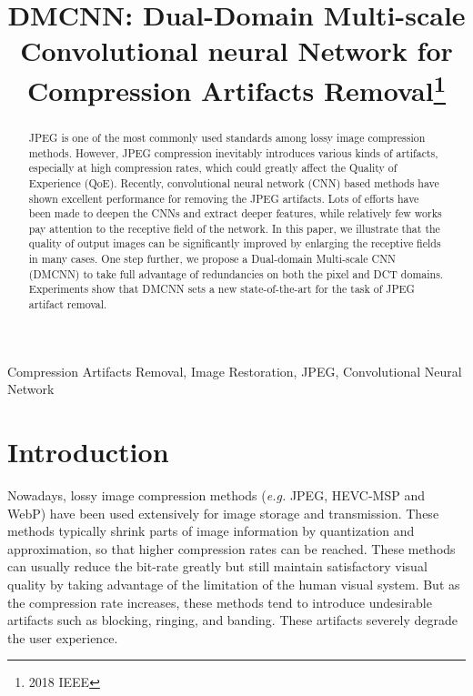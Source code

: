 \documentclass{article}
\title{DMCNN: Dual-Domain Multi-scale Convolutional neural Network 
for Compression Artifacts Removal\thanks{ 2018 IEEE}}
\begin{document}
\maketitle
\vspace{-0.2cm}
\begin{abstract}
JPEG is one of the most commonly used standards among lossy image compression
methods. However, JPEG compression inevitably introduces various kinds of
artifacts, especially at high compression rates, which could greatly affect
the Quality of Experience (QoE). Recently, convolutional neural network (CNN)
based methods have shown excellent performance for removing the JPEG artifacts.
Lots of efforts have been made to deepen the CNNs and extract deeper features,
while relatively few works pay attention to the receptive field of the network.
In this paper, we illustrate that the quality of output images can be
significantly improved by enlarging the receptive fields in many cases.
One step further, we propose a Dual-domain Multi-scale CNN (DMCNN) to
take full advantage of redundancies on both the pixel and DCT domains.
Experiments show that DMCNN sets a new state-of-the-art for the task of
JPEG artifact removal.
\end{abstract}
\begin{keywords}
Compression Artifacts Removal, Image Restoration, JPEG, Convolutional Neural
Network
\end{keywords}
\vspace{-0.2cm}
\section{Introduction}
\label{sec:intro}
Nowadays, lossy image compression methods (\textit{e.g.} JPEG, HEVC-MSP and WebP)
have been used extensively for image storage and transmission.
These methods typically shrink parts of image information by quantization
and approximation, so that higher compression rates can be reached. These
methods can usually reduce the bit-rate greatly but still maintain satisfactory
visual quality by taking advantage of the limitation of the
human visual system. But as the compression rate increases, these methods
tend to introduce undesirable artifacts such as
blocking, ringing, and banding. These artifacts severely degrade
the user experience.
\end{document}
